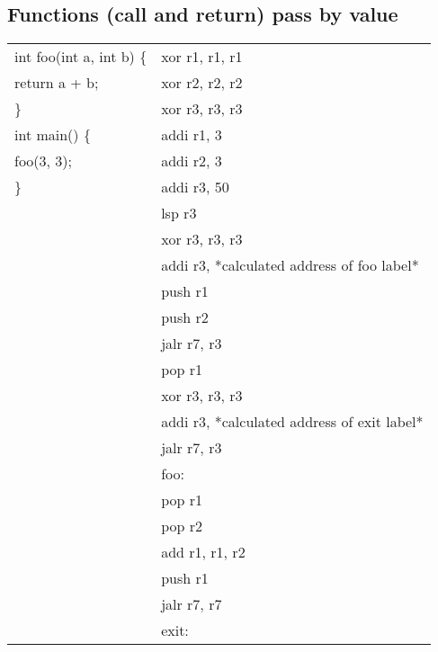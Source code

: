 \documentclass{article}
\begin{document}
\begin{par}
	\subsection{Functions (call and return) pass by value}
	\begin{center}
		\begin{tabular}{|l|l|}
			\hline
			int foo(int a, int b) \{ & xor r1, r1, r1 \\
				return a + b; & xor r2, r2, r2 \\
			\} & xor r3, r3, r3 \\
			int main() \{ & addi r1, 3 \\
				foo(3, 3); & addi r2, 3 \\
			\} & addi r3, 50 \\
			& lsp r3 \\
			& xor r3, r3, r3 \\
			& addi r3, *calculated address of foo label* \\
			& push r1 \\
			& push r2 \\
			& jalr r7, r3 \\
			& pop r1 \\
			& xor r3, r3, r3 \\
			& addi r3, *calculated address of exit label* \\
			& jalr r7, r3 \\
			& foo: \\
			& pop r1 \\
			& pop r2 \\
			& add r1, r1, r2 \\
			& push r1 \\
			& jalr r7, r7 \\
			& exit: \\
			\hline
		\end{tabular}
	\end{center}


\end{par}
\end{document}
